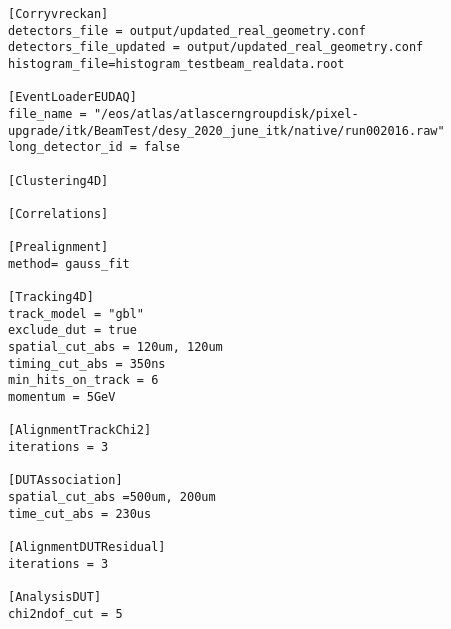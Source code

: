 \clearpage

\begin{lstlisting}[caption={Configuration file of Corryvreckan for the testbeam anaylsis of June 2020 Batch 3}]
[Corryvreckan]
detectors_file = output/updated_real_geometry.conf
detectors_file_updated = output/updated_real_geometry.conf
histogram_file=histogram_testbeam_realdata.root

[EventLoaderEUDAQ]
file_name = "/eos/atlas/atlascerngroupdisk/pixel-upgrade/itk/BeamTest/desy_2020_june_itk/native/run002016.raw"
long_detector_id = false

[Clustering4D]

[Correlations]

[Prealignment]
method= gauss_fit

[Tracking4D]
track_model = "gbl"
exclude_dut = true
spatial_cut_abs = 120um, 120um
timing_cut_abs = 350ns
min_hits_on_track = 6
momentum = 5GeV

[AlignmentTrackChi2]
iterations = 3

[DUTAssociation]
spatial_cut_abs =500um, 200um
time_cut_abs = 230us

[AlignmentDUTResidual]
iterations = 3

[AnalysisDUT]
chi2ndof_cut = 5
\end{lstlisting}

